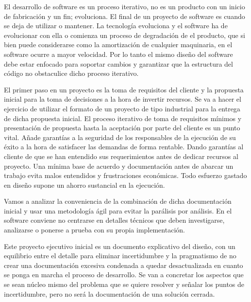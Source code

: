 El desarrollo de software es un proceso iterativo, no es un producto con un inicio de fabricación y un fin; evoluciona.
El final de un proyecto de software es cuando se deja de utilizar o mantener.
La tecnología evoluciona y el software ha de evolucionar con ella o comienza un proceso de degradación de el producto, que si bien puede considerarse como la amortización de cualquier maquinaria, en el software ocurre a mayor velocidad.
Por lo tanto el mismo diseño del software debe estar enfocado para soportar cambios y garantizar que la estructura del código no obstaculice dicho proceso iterativo.

El primer paso en un proyecto es la toma de requisitos del cliente y la propuesta inicial para la toma de decisiones a la hora de invertir recursos.
Se va a hacer el ejercicio de utilizar el formato de un proyecto de tipo industrial para la entrega de dicha propuesta inicial.
El proceso iterativo de toma de requisitos mínimos y presentación de propuesta hasta la aceptación por parte del cliente es un punto vital.
Añade garantías a la seguridad de los responsables de la ejecución de su éxito a la hora de satisfacer las demandas de forma rentable.
Dando garantías al cliente de que se han entendido sus requerimientos antes de dedicar recursos al proyecto.
Una mínima base de acuerdo y documentación antes de abarcar un trabajo evita malos entendidos y frustraciones económicas.
Todo esfuerzo gastado en diseño supone un ahorro sustancial en la ejecución.

Vamos a analizar la conveniencia de la combinación de dicha documentación inicial y usar una metodología ágil para evitar la parálisis por análisis.
En el software conviene no centrarse en detalles técnicos que deben investigarse, analizarse o ponerse a prueba con su propia implementación.

Este proyecto ejecutivo inicial es un documento explicativo del diseño, con un equilibrio entre el detalle para eliminar incertidumbre y la pragmatismo de no crear una documentación excesiva condenada a quedar desactualizada en cuanto se ponga en marcha el proceso de desarrollo.
Se van a concretar los aspectos que se sean núcleo mismo del problema que se quiere resolver y señalar los puntos de incertidumbre, pero no será la documentación de una solución cerrada.

